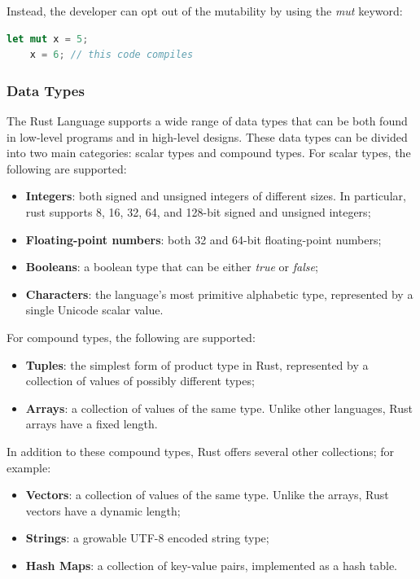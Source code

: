 Instead, the developer can opt out of the mutability by using the \textit{mut} keyword:

\begin{lstlisting}[language=Rust]
    let mut x = 5;
    x = 6; // this code compiles
\end{lstlisting}

\subsubsection{Data Types}
The Rust Language supports a wide range of data types that can be both found in low-level programs and in high-level designs. These data types can be divided into two main categories: scalar types and compound types.
For scalar types, the following are supported:
\begin{itemize}
    \item \textbf{Integers}: both signed and unsigned integers of different sizes. In particular, rust supports 8, 16, 32, 64, and 128-bit signed and unsigned integers;
    \item \textbf{Floating-point numbers}: both 32 and 64-bit floating-point numbers;
    \item \textbf{Booleans}: a boolean type that can be either \textit{true} or \textit{false};
    \item \textbf{Characters}: the language's most primitive alphabetic type, represented by a single Unicode scalar value.
\end{itemize}

For compound types, the following are supported:
\begin{itemize}
    \item \textbf{Tuples}: the simplest form of product type in Rust, represented by a collection of values of possibly different types;
    \item \textbf{Arrays}: a collection of values of the same type. Unlike other languages, Rust arrays have a fixed length.
\end{itemize}

In addition to these compound types, Rust offers several other collections; for example:

\begin{itemize}
    \item \textbf{Vectors}: a collection of values of the same type. Unlike the arrays, Rust vectors have a dynamic length;
    \item \textbf{Strings}: a growable UTF-8 encoded string type;
    \item \textbf{Hash Maps}: a collection of key-value pairs, implemented as a hash table.
\end{itemize}


